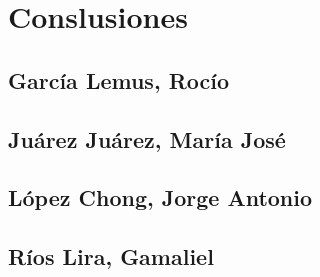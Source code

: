 \section*{Conslusiones}

\subsection*{García Lemus, Rocío}

\subsection*{Juárez Juárez, María José}

\subsection*{López Chong, Jorge Antonio}

\subsection*{Ríos Lira, Gamaliel}
